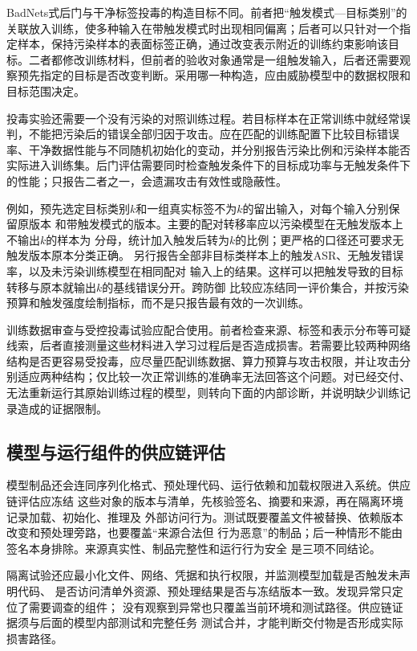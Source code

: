 BadNets式后门与干净标签投毒的构造目标不同。前者把“触发模式—目标类别”的关联放入训练，使多种输入在带触发模式时出现相同偏离；后者可以只针对一个指定样本，保持污染样本的表面标签正确，通过改变表示附近的训练约束影响该目标。二者都修改训练材料，但前者的验收对象通常是一组触发输入，后者还需要观察预先指定的目标是否改变判断。采用哪一种构造，应由威胁模型中的数据权限和目标范围决定。

投毒实验还需要一个没有污染的对照训练过程。若目标样本在正常训练中就经常误判，不能把污染后的错误全部归因于攻击。应在匹配的训练配置下比较目标错误率、干净数据性能与不同随机初始化的变动，并分别报告污染比例和污染样本能否实际进入训练集。后门评估需要同时检查触发条件下的目标成功率与无触发条件下的性能；只报告二者之一，会遗漏攻击有效性或隐蔽性。

例如，预先选定目标类别$k$和一组真实标签不为$k$的留出输入，对每个输入分别保留原版本
和带触发模式的版本。主要的配对转移率应以污染模型在无触发版本上不输出$k$的样本为
分母，统计加入触发后转为$k$的比例；更严格的口径还可要求无触发版本原本分类正确。
另行报告全部非目标类样本上的触发ASR、无触发错误率，以及未污染训练模型在相同配对
输入上的结果。这样可以把触发导致的目标转移与原本就输出$k$的基线错误分开。跨防御
比较应冻结同一评价集合，并按污染预算和触发强度绘制指标，而不是只报告最有效的一次训练。

训练数据审查与受控投毒试验应配合使用。前者检查来源、标签和表示分布等可疑线索，后者直接测量这些材料进入学习过程后是否造成损害。若需要比较两种网络结构是否更容易受投毒，应尽量匹配训练数据、算力预算与攻击权限，并让攻击分别适应两种结构；仅比较一次正常训练的准确率无法回答这个问题。对已经交付、无法重新运行其原始训练过程的模型，则转向下面的内部诊断，并说明缺少训练记录造成的证据限制。

\subsection{模型与运行组件的供应链评估}
\label{sec:security-supply-chain-test}

模型制品还会连同序列化格式、预处理代码、运行依赖和加载权限进入系统。供应链评估应冻结
这些对象的版本与清单，先核验签名、摘要和来源，再在隔离环境记录加载、初始化、推理及
外部访问行为。测试既要覆盖文件被替换、依赖版本改变和预处理旁路，也要覆盖“来源合法但
行为恶意”的制品；后一种情形不能由签名本身排除。来源真实性、制品完整性和运行行为安全
是三项不同结论。

隔离试验还应最小化文件、网络、凭据和执行权限，并监测模型加载是否触发未声明代码、
是否访问清单外资源、预处理结果是否与冻结版本一致。发现异常只定位了需要调查的组件；
没有观察到异常也只覆盖当前环境和测试路径。供应链证据须与后面的模型内部测试和完整任务
测试合并，才能判断交付物是否形成实际损害路径。

